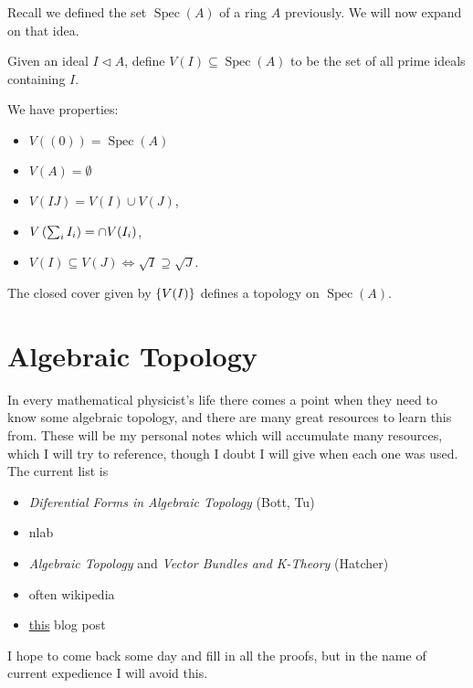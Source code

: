 \documentclass{article}
\begin{document}
Recall we defined the set $\operatorname{Spec}(A)$ of a ring $A$ previously. We will now expand on that idea. 
\begin{definition}
	Given an ideal $I \triangleleft A$, define $V(I) \subseteq \operatorname{Spec}(A)$ to be the set of all prime ideals containing $I$. 
\end{definition}

\begin{lemma}
	We have properties:	\begin{itemize}
		\item $V((0)) = \operatorname{Spec}(A)$
		\item $V(A) = \emptyset$
		\item $V(IJ) = V(I) \cup V(J)$, 
		\item $V\left( \sum_i I_i \right) = \cap V(I_i)$, 
		\item $V(I) \subseteq V(J) \Leftrightarrow \sqrt{I} \supseteq \sqrt{J}$. 
	\end{itemize}
\end{lemma}
\begin{corollary}
	The closed cover given by $\left\{ V(I) \right\}$ defines a topology on $\operatorname{Spec}(A)$. 
\end{corollary}

\part{Algebraic Topology}
In every mathematical physicist's life there comes a point when they need to know some algebraic topology, and there are many great resources to learn this from. These will be my personal notes which will accumulate many resources, which I will try to reference, though I doubt I will give when each one was used. The current list is 
\begin{itemize} 
	\item \textit{Diferential Forms in Algebraic Topology} (Bott, Tu)
	\item nlab
	\item \textit{Algebraic Topology} and \textit{Vector Bundles and K-Theory} (Hatcher) 
	\item often wikipedia
	\item  \href{https://amathew.wordpress.com/2011/08/05/chern-classes/?fbclid=IwAR28yPxJ8rlcn3DXnWs9ouq9fhrQH9VJ5giZ-JujFziTBD5dvM-pzMzMSig}{this} blog post
\end{itemize} 
I hope to come back some day and fill in all the proofs, but in the name of current expedience I will avoid this. 
\end{document}
